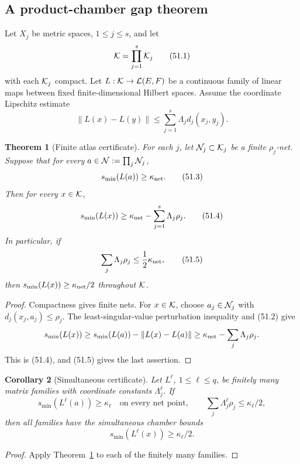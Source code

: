 \documentclass[11pt]{article}
\newtheorem{theorem}{Theorem}[section]
\newtheorem{corollary}[theorem]{Corollary}
\begin{document}
\subsection{A product-chamber gap theorem}

Let \(X_j\) be metric spaces, \(1\le j\le s\), and let
\[
                         {\cal K}=\prod_{j=1}^s{\cal K}_j      \tag{51.1}
\]
with each \({\cal K}_j\) compact.  Let
\(L:{\cal K}\to{\cal L}(E,F)\) be a continuous family of linear maps
between fixed finite-dimensional Hilbert spaces.  Assume the
coordinate Lipschitz estimate
\[
 \lVert L(x)-L(y)\rVert
       \le\sum_{j=1}^s\Lambda_jd_j(x_j,y_j).                  \tag{51.2}
\]

\begin{theorem}[Finite atlas certificate]
\label{thm:v11v51-atlas}
For each \(j\), let \({\cal N}_j\subset{\cal K}_j\) be a finite
\(\rho_j\)-net.  Suppose that for every
\(a\in{\cal N}:=\prod_j{\cal N}_j\),
\[
                         s_{\min}(L(a))\ge\kappa_{\rm net}.    \tag{51.3}
\]
Then for every \(x\in{\cal K}\),
\[
 s_{\min}(L(x))
       \ge\kappa_{\rm net}-\sum_{j=1}^s\Lambda_j\rho_j.        \tag{51.4}
\]
In particular, if
\[
                    \sum_j\Lambda_j\rho_j
                         \le\frac12\kappa_{\rm net},           \tag{51.5}
\]
then \(s_{\min}(L(x))\ge\kappa_{\rm net}/2\) throughout
\({\cal K}\).
\end{theorem}

\begin{proof}
Compactness gives finite nets.  For \(x\in{\cal K}\), choose
\(a_j\in{\cal N}_j\) with \(d_j(x_j,a_j)\le\rho_j\).
The least-singular-value perturbation inequality and (51.2) give
\[
 s_{\min}(L(x))
 \ge s_{\min}(L(a))-\lVert L(x)-L(a)\rVert
 \ge\kappa_{\rm net}-\sum_j\Lambda_j\rho_j.
\]
This is (51.4), and (51.5) gives the last assertion.
\end{proof}

\begin{corollary}[Simultaneous certificate]
\label{cor:v11v51-simultaneous}
Let \(L^\ell\), \(1\le\ell\le q\), be finitely many matrix families
with coordinate constants \(\Lambda_j^\ell\).  If
\[
 s_{\min}(L^\ell(a))\ge\kappa_\ell
 \quad\text{on every net point},\qquad
 \sum_j\Lambda_j^\ell\rho_j\le\kappa_\ell/2,                 \tag{51.6}
\]
then all families have the simultaneous chamber bounds
\[
                       s_{\min}(L^\ell(x))\ge\kappa_\ell/2.   \tag{51.7}
\]
\end{corollary}

\begin{proof}
Apply Theorem~\ref{thm:v11v51-atlas} to each of the finitely many
families.
\end{proof}
\end{document}
